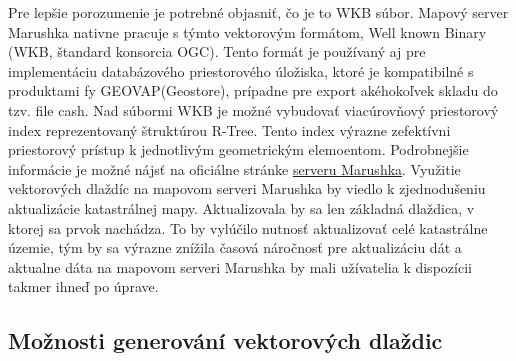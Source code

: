 \documentclass[12pt]{article}
\begin{document}
 Pre lepšie porozumenie je potrebné objasniť, čo je to WKB súbor. Mapový server Marushka nativne pracuje s týmto vektorovým formátom, Well known Binary (WKB, štandard konsorcia OGC). Tento formát je používaný aj pre implementáciu databázového priestorového úložiska, ktoré je kompatibilné s produktami fy GEOVAP(Geostore), prípadne pre export akéhokoľvek skladu do tzv. file cash. 
 \newline Nad súbormi WKB je možné vybudovať viacúrovňový priestorový index reprezentovaný štruktúrou R-Tree. Tento index výrazne zefektívni priestorový prístup k jednotlivým geometrickým elemoentom. Podrobnejšie informácie je možné nájsť na oficiálne stránke  \href{http://geovap.q2.cz/marushka/cz/produkty-a-sluzby/categoryId/3/souborove-vektorove-formaty-/popis/architektura/2#item15}{ serveru Marushka}.
 \newline Využitie vektorových dlaždíc na mapovom serveri Marushka by viedlo k zjednodušeniu aktualizácie katastrálnej mapy. Aktualizovala by sa len základná dlaždica, v ktorej sa prvok nachádza. To by vylúčilo nutnosť aktualizovať celé katastrálne územie, tým by sa výrazne znížila časová náročnosť pre aktualizáciu dát a aktualne dáta na mapovom serveri Marushka by mali užívatelia k dispozícii takmer ihneď po úprave.

\subsection{Možnosti generování vektorových dlaždic}
\end{document}
